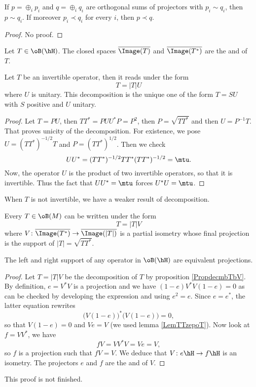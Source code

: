 \begin{proposition}
If $p=\oplus_i p_i$ and $q=\oplus_iq_i$ are orthogonal sums of projectors with $p_i\sim q_i$, then $p\sim q_i$. If moreover $p_i\prec q_i$ for every $i$, then $p\prec q$.
\end{proposition}
\begin{proof}
No proof.
\end{proof}

Let $T\in\oB(\hH)$. The closed spaces $\overline{ \Image(T) }$ and $\overline{ \Image(T^*) }$ are the  and  of $T$.

\begin{theorem}
Let $T$ be an invertible operator, then it reads under the form
\[ 
  T=| T |U
\]
where $U$ is unitary. This decomposition is the unique one of the form $T=SU$ with $S$ positive and $U$ unitary.
\end{theorem}

\begin{proof}
Let $T=PU$, then $TT^*=PUU^*P=P^2$, then $P=\sqrt{TT^*}$ and then $U=P^{-1}T$. That proves unicity of the decomposition. For existence, we pose $U=(TT^*)^{-1/2}T$ and $P=(TT^*)^{1/2}$. Then we check
\begin{equation}
	UU^*=(TT^*)^{-1/2}TT^*(TT^*)^{-1/2}=\mtu.
\end{equation}
 Now, the operator $U$ is the product of two invertible operators, so that it is invertible. Thus the fact that $UU^*=\mtu$ forces $U^*U=\mtu$.
\end{proof}

When $T$ is not invertible, we have a weaker result of decomposition.
\begin{proposition}		\label{PropdecmbTbV}
Every $T\in\oB(M)$ can be written under the form
\[ 
  	T=| T |V
\]
 where $V\colon \overline{ \Image(T^*) }\to \overline{ \Image(| T |) }$ is a partial isometry whose final projection is the support of $| T |=\sqrt{TT^*}$.
\end{proposition}

\begin{proposition}
The left and right support of any operator in $\oB(\hH)$ are equivalent projections.
\end{proposition}

\begin{proof}
Let $T=| T |V$ be the decomposition of $T$ by proposition \ref{PropdecmbTbV}. By definition, $e=V^*V$ is a projection and we have $(1-e)V^*V(1-e)=0$ as can be checked by developing the expression and using $e^2=e$. Since $e=e^*$, the latter equation rewrites
\[ 
  \big( V(1-e) \big)^*\big( V(1-e) \big)=0,
\]
so that $V(1-e)=0$ and $Ve=V$ (we used lemma \ref{LemTTzepoT}). Now look at $f=VV^*$, we have
\[ 
  fV=VV^*V=Ve=V,
\]
so $f$ is a projection such that $fV=V$. We deduce that $V\colon e\hH\to f\hH$ is an isometry. The projectors $e$ and $f$ are the  and   of $V$.
\end{proof}
\begin{probleme}
This proof is not finished.
\end{probleme}

